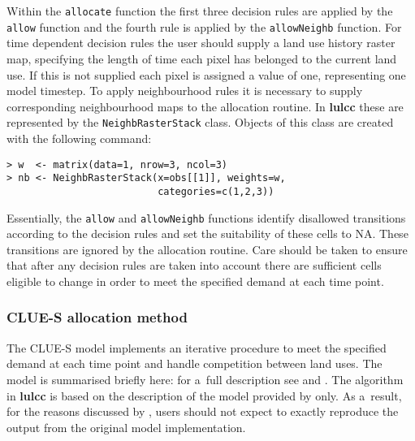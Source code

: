 \documentclass{icldt}\usepackage[]{graphicx}\usepackage[]{color}
\begin{document}
Within the \texttt{allocate} function the first three decision rules are applied by the \texttt{allow} function and the fourth rule is applied by the \texttt{allowNeighb} function. For time dependent decision rules the user should supply a land use history raster map, specifying the length of time each pixel has belonged to the current land use. If this is not supplied each pixel is assigned a value of one, representing one model timestep. To apply neighbourhood rules it is necessary to supply corresponding neighbourhood maps to the allocation routine. In \textbf{lulcc} these are represented by the \texttt{NeighbRasterStack} class. Objects of this class are created with the following command:
\begin{verbatim}
> w  <- matrix(data=1, nrow=3, ncol=3)
> nb <- NeighbRasterStack(x=obs[[1]], weights=w, 
                          categories=c(1,2,3))
\end{verbatim}

Essentially, the \texttt{allow} and \texttt{allowNeighb} functions identify disallowed transitions according to the decision rules and set the suitability of these cells to NA. These transitions are ignored by the allocation routine. Care should be taken to ensure that after any decision rules are taken into account there are sufficient cells eligible to change in order to meet the specified demand at each time point. \\

\subsubsection{CLUE-S allocation method}

The CLUE-S model implements an iterative procedure to meet the specified demand at each time point and handle competition between land uses. The model is summarised briefly here: for a~full description see \citet{verburg2002} and \citet{castella2007}. The algorithm in \textbf{lulcc} is based on the description of the model provided by \citet{verburg2002} only. As a~result, for the reasons discussed by \citet{ince2012}, users should not expect to exactly reproduce the output from the original model implementation. \\
\end{document}
